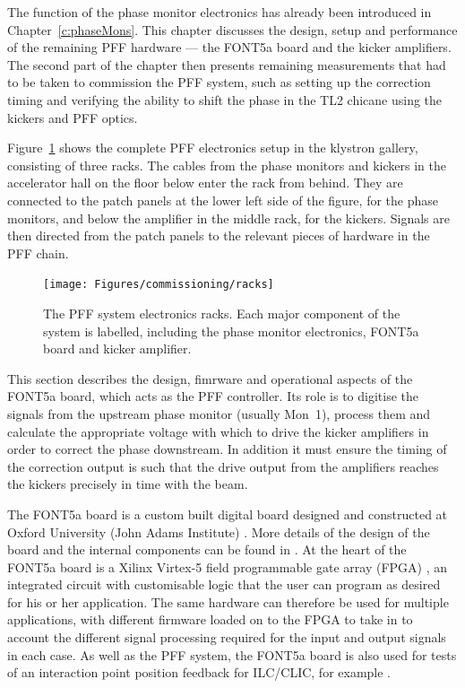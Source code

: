 
The function of the phase monitor electronics has already been introduced in Chapter~\ref{c:phaseMons}. This chapter discusses the design, setup and performance of the remaining PFF hardware --- the FONT5a board and the kicker amplifiers. The second part of the chapter then presents remaining measurements that had to be taken to commission the PFF system, such as setting up the correction timing and verifying the ability to shift the phase in the TL2 chicane using the kickers and PFF optics.

Figure~\ref{f:racks} shows the complete PFF electronics setup in the klystron gallery, consisting of three racks. The cables from the phase monitors and kickers in the accelerator hall on the floor below enter the rack from behind. They are connected to the patch panels at the lower left side of the figure, for the phase monitors, and below the amplifier in the middle rack, for the kickers. Signals are then directed from the patch panels to the relevant pieces of hardware in the PFF chain. 

\begin{figure}
  \centering
  \texttt{[image: Figures/commissioning/racks]}
  \caption{The PFF system electronics racks. Each major component of the system is labelled, including the phase monitor electronics, FONT5a board and kicker amplifier.}
  \label{f:racks}
\end{figure}


This section describes the design, fimrware and operational aspects of the FONT5a board, which acts as the PFF controller. Its role is to digitise the signals from the upstream phase monitor (usually Mon~1), process them and calculate the appropriate voltage with which to drive the kicker amplifiers in order to correct the phase downstream. In addition it must ensure the timing of the correction output is such that the drive output from the amplifiers reaches the kickers precisely in time with the beam.

The FONT5a board is a custom built digital board designed and constructed at Oxford University (John Adams Institute) \cite{fontGroup}. More details of the design of the board and the internal components can be found in \cite{dougThesis}. 
At the heart of the FONT5a board is a Xilinx Virtex-5 field programmable gate array (FPGA) \cite{xilinx}, an integrated circuit with customisable logic that the user can program as desired for his or her application. The same hardware can therefore be used for multiple applications, with different firmware loaded on to the FPGA to take in to account the different signal processing required for the input and output signals in each case. As well as the PFF system, the FONT5a board is also used for tests of an interaction point position feedback for ILC/CLIC, for example \cite{ipfbIPAC16}. 

